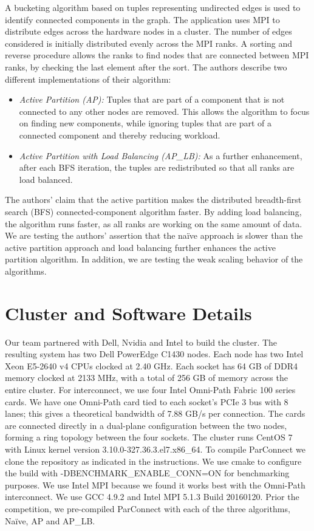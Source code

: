 \documentclass[11pt]{amsart}
\begin{document}
A bucketing algorithm based on tuples representing undirected edges is used to identify connected components in the graph. 
The application uses MPI to distribute edges across the hardware nodes in a cluster.  The number of edges considered is initially
distributed evenly across the MPI ranks. A sorting and reverse procedure allows the ranks to find nodes that are connected between MPI
ranks, by checking the last element after the sort. 
The authors describe two different implementations of their algorithm:
\begin{itemize}
\item \textit{Active Partition (AP):}
Tuples that are part of a
component that is not connected to any other nodes are removed. This allows the algorithm to focus on finding new components, while
ignoring tuples that are part of a connected component and thereby reducing workload. 
\item \textit{Active Partition with Load Balancing (AP\_LB):}
As a further enhancement, after each BFS iteration, the tuples are redistributed so that all ranks are load balanced. 
\end{itemize}

The authors' claim that the active partition makes the distributed breadth-first search (BFS) connected-component algorithm faster.   By adding load balancing, the algorithm runs faster, as all ranks are working on the same amount of data. We are testing the authors' assertion that the na{\"i}ve approach is slower than the active partition approach and load balancing further enhances the active partition algorithm. In addition, we are testing the weak scaling behavior of the algorithms.

\section{Cluster and Software Details}
Our team partnered with Dell, Nvidia and Intel to build the cluster.  The resulting system
has two Dell PowerEdge C1430 nodes. Each node has two Intel Xeon E5-2640 v4 CPUs clocked at 2.40 GHz. Each socket has 64 GB of DDR4 memory clocked at 2133 MHz, with a total of 256 GB of memory across the entire cluster. For interconnect, we use four Intel Omni-Path Fabric 100 series cards. We have one Omni-Path card tied to each socket's PCIe 3 bus with 8 lanes; this gives a theoretical bandwidth of 7.88 GB/s per connection.  The cards are connected directly in a dual-plane configuration between the two nodes, forming a ring topology between the four sockets. The cluster runs CentOS 7 with Linux kernel version 3.10.0-327.36.3.el7.x86\_64.
 To compile ParConnect we clone the repository as indicated in the instructions. We use cmake to configure the build with
 -DBENCHMARK\_ENABLE\_CONN=ON for benchmarking purposes. We use Intel MPI because we found it works best with the Omni-Path interconnect.  We use GCC 4.9.2 and Intel MPI 5.1.3 Build 20160120. Prior the competition, we pre-compiled ParConnect with each of the three algorithms, Na{\"i}ve, AP and AP\_LB. 
 
\end{document}
